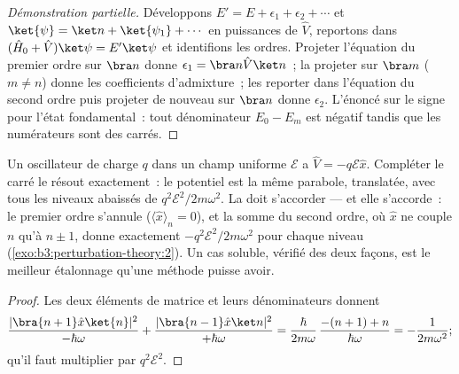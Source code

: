 \begin{proof}[Démonstration partielle]
Développons $E' = E + \epsilon_1 + \epsilon_2 + \cdots$ et $\ket{\psi} =
\ket n + \ket{\psi_1} + \cdots$ en puissances de $\hat V$, reportons
dans $(\hat H_0 + \hat V)\ket\psi = E'\ket\psi$ et identifions les
ordres. Projeter l'équation du premier ordre sur $\bra n$ donne $\epsilon_1 =
\bra n\hat V\ket n$~; la projeter sur $\bra m$ ($m \neq n$) donne les
coefficients d'admixture~; les reporter dans l'équation du second
ordre puis projeter de nouveau sur $\bra n$ donne $\epsilon_2$.
L'énoncé sur le signe pour l'état fondamental~: tout dénominateur
$E_0 - E_m$ est négatif tandis que les numérateurs sont des carrés.
\end{proof}

\begin{proposition}\label{prop:b3:perturbation-theory:oscillator-field}
Un oscillateur de charge $q$ dans un champ uniforme $\mathcal E$ a
$\hat V = -q\mathcal E\hat x$. Compléter le carré le résout
exactement~: le potentiel est la même parabole, translatée, avec tous
les niveaux abaissés de $q^2\mathcal E^2/2m\omega^2$. La  doit s'accorder --- et elle s'accorde~: le premier ordre
s'annule ($\langle\hat
x\rangle_n = 0$), et la somme du second ordre, où $\hat x$ ne couple
$n$ qu'à $n \pm 1$, donne exactement
$-q^2\mathcal E^2/2m\omega^2$ pour chaque niveau
(\cref{exo:b3:perturbation-theory:2}). Un cas soluble, vérifié des
deux façons, est le meilleur étalonnage qu'une méthode puisse avoir.
\end{proposition}

\begin{proof}
Les deux éléments de matrice et leurs dénominateurs donnent
\[
\frac{|\bra{n+1}\hat x\ket{n}|^2}{-\hbar\omega}
 + \frac{|\bra{n-1}\hat x\ket n|^2}{+\hbar\omega}
 = \frac{\hbar}{2m\omega}\,\frac{-(n+1) + n}{\hbar\omega}
 = -\frac{1}{2m\omega^2} ;
\]
qu'il faut multiplier par $q^2\mathcal E^2$.
\end{proof}


